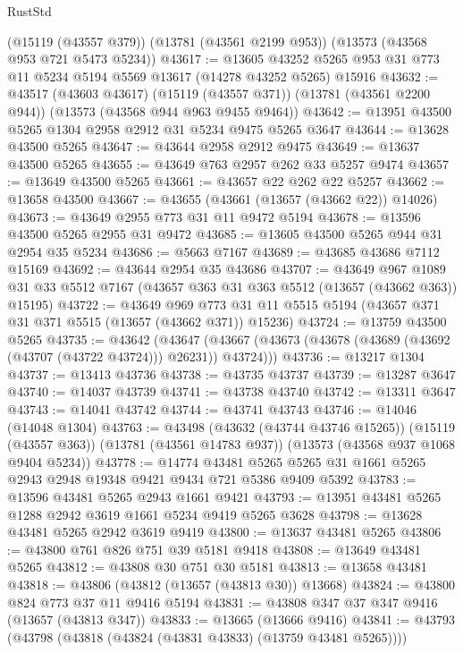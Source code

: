 \begin{lexlean}{RustStd}
\begin{coremodule}
    (@15119 (@43557 @379))
    (@13781 (@43561 @2199 @953))
    (@13573 (@43568 @953 @721 @5473 @5234))
@43617 := @13605
    @43252
    @5265
    @953
    @31
    @773
    @11
    @5234
    @5194
    @5569
    @13617
    (@14278 @43252 @5265)
    @15916
@43632 := @43517
    (@43603 @43617)
    (@15119 (@43557 @371))
    (@13781 (@43561 @2200 @944))
    (@13573 (@43568 @944 @963 @9455 @9464))
@43642 := @13951 @43500 @5265 @1304 @2958 @2912 @31 @5234 @9475 @5265 @3647
@43644 := @13628 @43500 @5265
@43647 := @43644 @2958 @2912 @9475
@43649 := @13637 @43500 @5265
@43655 := @43649 @763 @2957 @262 @33 @5257 @9474
@43657 := @13649 @43500 @5265
@43661 := @43657 @22 @262 @22 @5257
@43662 := @13658 @43500
@43667 := @43655 (@43661 (@13657 (@43662 @22)) @14026)
@43673 := @43649 @2955 @773 @31 @11 @9472 @5194
@43678 := @13596 @43500 @5265 @2955 @31 @9472
@43685 := @13605 @43500 @5265 @944 @31 @2954 @35 @5234
@43686 := @5663 @7167
@43689 := @43685 @43686 @7112 @15169
@43692 := @43644 @2954 @35 @43686
@43707 := @43649
    @967
    @1089
    @31
    @33
    @5512
    @7167
    (@43657 @363 @31 @363 @5512 (@13657 (@43662 @363)) @15195)
@43722 := @43649
    @969
    @773
    @31
    @11
    @5515
    @5194
    (@43657 @371 @31 @371 @5515 (@13657 (@43662 @371)) @15236)
@43724 := @13759 @43500 @5265
@43735 := @43642
    (@43647 (@43667 (@43673 (@43678 (@43689 (@43692 (@43707 (@43722 @43724))) @26231)) @43724)))
@43736 := @13217 @1304
@43737 := @13413 @43736
@43738 := @43735 @43737
@43739 := @13287 @3647
@43740 := @14037 @43739
@43741 := @43738 @43740
@43742 := @13311 @3647
@43743 := @14041 @43742
@43744 := @43741 @43743
@43746 := @14046 (@14048 @1304)
@43763 := @43498
    (@43632 (@43744 @43746 @15265))
    (@15119 (@43557 @363))
    (@13781 (@43561 @14783 @937))
    (@13573 (@43568 @937 @1068 @9404 @5234))
@43778 := @14774
    @43481
    @5265
    @5265
    @31
    @1661
    @5265
    @2943
    @2948
    @19348
    @9421
    @9434
    @721
    @5386
    @9409
    @5392
@43783 := @13596 @43481 @5265 @2943 @1661 @9421
@43793 := @13951 @43481 @5265 @1288 @2942 @3619 @1661 @5234 @9419 @5265 @3628
@43798 := @13628 @43481 @5265 @2942 @3619 @9419
@43800 := @13637 @43481 @5265
@43806 := @43800 @761 @826 @751 @39 @5181 @9418
@43808 := @13649 @43481 @5265
@43812 := @43808 @30 @751 @30 @5181
@43813 := @13658 @43481
@43818 := @43806 (@43812 (@13657 (@43813 @30)) @13668)
@43824 := @43800 @824 @773 @37 @11 @9416 @5194
@43831 := @43808 @347 @37 @347 @9416 (@13657 (@43813 @347))
@43833 := @13665 (@13666 @9416)
@43841 := @43793 (@43798 (@43818 (@43824 (@43831 @43833) (@13759 @43481 @5265))))

\end{coremodule}
\end{lexlean}

